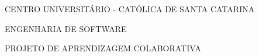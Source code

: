 

\renewcommand{\imprimircapa}{%
	\begin{capa}%
		\center

		{\fontseries{b}\selectfont\MakeTextUppercase{CENTRO UNIVERSITÁRIO - CATÓLICA DE SANTA Catarina}}
		
		{\fontseries{b}\selectfont\MakeTextUppercase{ENGENHARIA DE SOFTWARE}}
		
		{\fontseries{b}\selectfont\MakeTextUppercase{PROJETO DE APRENDIZAGEM COLABORATIVA}}
		
		\vfill
		
		{\fontseries{b}\selectfont\MakeTextUppercase{\normalsize\imprimirautor}}
		
		\vfill
		\begin{center}
			{\fontseries{b}\selectfont\MakeTextUppercase{\imprimirtitulo}}
		\end{center}
		\vfill
		
		\vfill
		
		{\fontseries{b}\selectfont\MakeTextUppercase{\imprimirlocal}}
		\par
		{\selectfont \imprimirdata}
		\vspace*{1cm}
	\end{capa}
}



\imprimircapa				%

